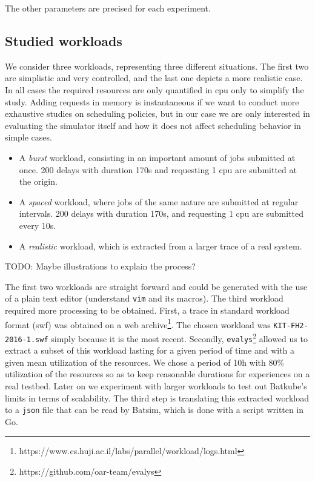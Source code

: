 \documentclass[12pt, a4paper]{memoir}
\begin{document}
The other parameters are precised for each experiment.

\subsection{Studied workloads}

We consider three workloads, representing three different situations. The first
two are simplistic and very controlled, and the last one depicts a more
realistic case. In all cases the required resources are only quantified in cpu
only to simplify the study. Adding requests in memory is instantaneous if we
want to conduct more exhaustive studies on scheduling policies, but in our case
we are only interested in evaluating the simulator itself and how it does not
affect scheduling behavior in simple cases.
\begin{itemize}
	\item A \textit{burst} workload, consisting in an important amount of
		jobs submitted at once.  200 delays with duration 170s and
		requesting 1 cpu are submitted at the origin.
	\item A \textit{spaced} workload, where jobs of the same nature are
		submitted at regular intervals.  200 delays with duration 170s,
		and requesting 1 cpu are submitted every 10s.
	\item A \textit{realistic} workload, which is extracted from a larger
		trace of a real system.
\end{itemize}


TODO: Maybe illustrations to explain the process?

The first two workloads are straight forward and could be generated with the
use of a plain text editor (understand \texttt{vim} and its macros). The third
workload required more processing to be obtained.  First, a trace in standard
workload format (swf) was obtained on a web
archive\footnote{https://www.cs.huji.ac.il/labs/parallel/workload/logs.html}.
The chosen workload was \texttt{KIT-FH2-2016-1.swf} simply because it is the
most recent. Secondly,
\texttt{evalys}\footnote{https://github.com/oar-team/evalys} allowed us to
extract a subset of this workload lasting for a given period of time and with a
given mean utilization of the resources. We chose a period of 10h with 80\%
utilization of the resources so as to keep reasonable durations for experiences
on a real testbed. Later on we experiment with larger workloads to test out
Batkube's limits in terms of scalability.  The third step is translating this
extracted workload to a \texttt{json} file that can be read by Batsim, which is
done with a script written in Go.
\end{document}
